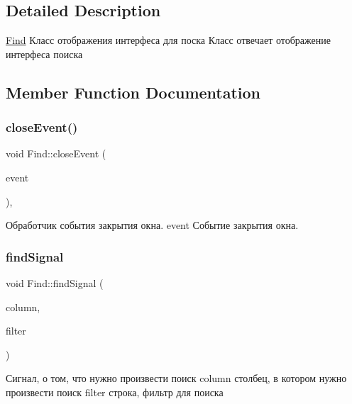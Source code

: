 \subsection{Detailed Description}
\mbox{\hyperlink{class_find}{Find}} Класс отображения интерфеса для поска Класс отвечает отображение интерфеса поиска 

\subsection{Member Function Documentation}
\mbox{\label{class_find_a9d214f69abd560f8558da6cc316de5c6}} 
\subsubsection{\texorpdfstring{closeEvent()}{closeEvent()}}
{\footnotesize\ttfamily void Find\+::close\+Event (\begin{DoxyParamCaption}\item[{Q\+Close\+Event $\ast$}]{event }\end{DoxyParamCaption})\hspace{0.3cm}{\ttfamily [override]}, {\ttfamily [protected]}}

Обработчик события закрытия окна. event Событие закрытия окна. \mbox{\label{class_find_a7d992611a1c754fdb7ca43c2b9ec923c}} 
\subsubsection{\texorpdfstring{findSignal}{findSignal}}
{\footnotesize\ttfamily void Find\+::find\+Signal (\begin{DoxyParamCaption}\item[{int}]{column,  }\item[{const Q\+String \&}]{filter }\end{DoxyParamCaption})\hspace{0.3cm}{\ttfamily [signal]}}

Сигнал, о том, что нужно произвести поиск column столбец, в котором нужно произвести поиск filter строка, фильтр для поиска \mbox{\label{class_find_a3acea10ee973c2de1983dd2657b66a89}} 
